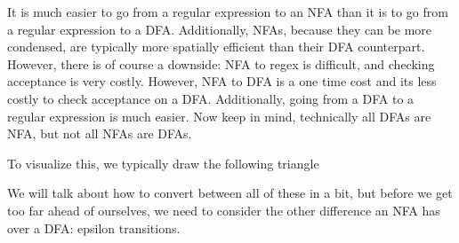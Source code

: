 \documentclass[main.tex]{subfiles}
\begin{document}
It is much easier to go from a regular expression to an NFA than it is to go from a regular expression to a DFA. Additionally, NFAs, because they can be more condensed, are typically more spatially efficient than their DFA counterpart. However, there is of course a downside: NFA to regex is difficult, and checking acceptance is very costly. 
However, NFA to DFA is a one time cost and its less costly to check acceptance on a DFA. Additionally, going from a DFA to a regular expression is much easier. Now keep in mind, technically all DFAs are NFA, but not all NFAs are DFAs.

To visualize this, we typically draw the following triangle
\begin{center}
\end{center}

We will talk about how to convert between all of these in a bit, but before we get too far ahead of ourselves, we need to consider the other difference an NFA has over a DFA: epsilon transitions. 
\end{document}
